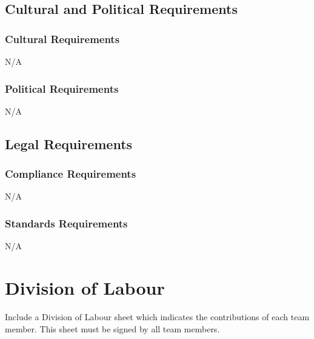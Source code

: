 \documentclass[]{article}
\begin{document}
\subsection{Cultural and Political Requirements}
\label{sub:cultural_and_political_requirements}

\subsubsection{Cultural Requirements}
\label{ssub:cultural_requirements}
N/A

\subsubsection{Political Requirements}
\label{ssub:political_requirements}
N/A

\subsection{Legal Requirements}
\label{sub:legal_requirements}

\subsubsection{Compliance Requirements}
\label{ssub:compliance_requirements}
N/A

\subsubsection{Standards Requirements}
\label{ssub:standards_requirements}
N/A

\appendix
\section{Division of Labour}
\label{sec:division_of_labour}
Include a Division of Labour sheet which indicates the contributions of each team member. This sheet must be signed by all team members.

\newpage
\end{document}
